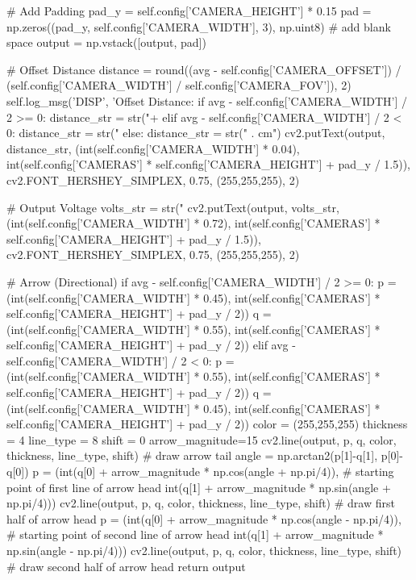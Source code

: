 \begin{python}
        # Add Padding
        pad_y = self.config['CAMERA_HEIGHT'] * 0.15
        pad = np.zeros((pad_y, self.config['CAMERA_WIDTH'], 3), np.uint8) # add blank space
        output = np.vstack([output, pad])

        # Offset Distance
        distance = round((avg - self.config['CAMERA_OFFSET']) / (self.config['CAMERA_WIDTH'] / self.config['CAMERA_FOV']), 2)
        self.log_msg('DISP', 'Offset Distance: %
        if avg - self.config['CAMERA_WIDTH'] / 2 >= 0:
            distance_str = str("+%
        elif avg - self.config['CAMERA_WIDTH'] / 2 < 0:
            distance_str = str("%
        else:
            distance_str = str("  .  cm")
        cv2.putText(output, distance_str, (int(self.config['CAMERA_WIDTH'] * 0.04), int(self.config['CAMERAS'] * self.config['CAMERA_HEIGHT'] + pad_y / 1.5)), cv2.FONT_HERSHEY_SIMPLEX, 0.75, (255,255,255), 2)
                
        # Output Voltage
        volts_str = str("%
        cv2.putText(output, volts_str, (int(self.config['CAMERA_WIDTH'] * 0.72), int(self.config['CAMERAS'] * self.config['CAMERA_HEIGHT'] + pad_y / 1.5)), cv2.FONT_HERSHEY_SIMPLEX, 0.75, (255,255,255), 2)
                
        # Arrow (Directional)
        if avg - self.config['CAMERA_WIDTH'] / 2 >= 0:
            p = (int(self.config['CAMERA_WIDTH'] * 0.45), int(self.config['CAMERAS'] * self.config['CAMERA_HEIGHT'] + pad_y / 2))
            q = (int(self.config['CAMERA_WIDTH'] * 0.55), int(self.config['CAMERAS'] * self.config['CAMERA_HEIGHT'] + pad_y / 2))
        elif avg - self.config['CAMERA_WIDTH'] / 2 < 0:
            p = (int(self.config['CAMERA_WIDTH'] * 0.55), int(self.config['CAMERAS'] * self.config['CAMERA_HEIGHT'] + pad_y / 2))
            q = (int(self.config['CAMERA_WIDTH'] * 0.45), int(self.config['CAMERAS'] * self.config['CAMERA_HEIGHT'] + pad_y / 2))
        color = (255,255,255)
        thickness = 4
        line_type = 8
        shift = 0
        arrow_magnitude=15
        cv2.line(output, p, q, color, thickness, line_type, shift) # draw arrow tail
        angle = np.arctan2(p[1]-q[1], p[0]-q[0])
        p = (int(q[0] + arrow_magnitude * np.cos(angle + np.pi/4)), # starting point of first line of arrow head 
        int(q[1] + arrow_magnitude * np.sin(angle + np.pi/4)))
        cv2.line(output, p, q, color, thickness, line_type, shift) # draw first half of arrow head
        p = (int(q[0] + arrow_magnitude * np.cos(angle - np.pi/4)), # starting point of second line of arrow head 
        int(q[1] + arrow_magnitude * np.sin(angle - np.pi/4)))
        cv2.line(output, p, q, color, thickness, line_type, shift) # draw second half of arrow head
        return output


\end{python}
